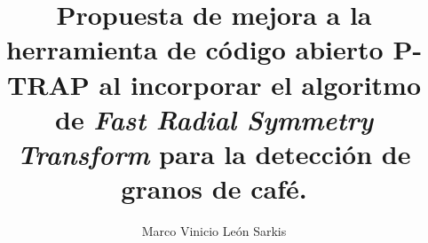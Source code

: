 \title{Propuesta de mejora a la herramienta de c\'odigo abierto P-TRAP al incorporar el algoritmo de \textit{Fast Radial Symmetry Transform} para la detecci\'on de granos de caf\'e.}
\author{Marco Vinicio Le\'on Sarkis}
\maketitle
\cleardoublepage
\setcounter{savepage}{\thepage}
\begin{abstractpage}

\end{abstractpage}
